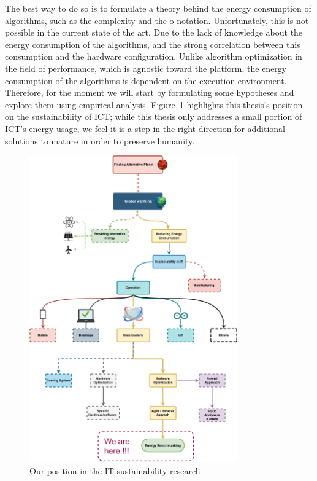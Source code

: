 The best way to do so is to formulate a theory behind the energy consumption of algorithms, such as the complexity and the o notation.
Unfortunately, this is not possible in the current state of the art. Due to the lack of knowledge about the energy consumption of the algorithms, and the strong correlation between this consumption and the hardware configuration.
Unlike algorithm optimization in the field of performance, which is agnostic toward the platform, the energy consumption of the algorithms is dependent on the execution environment.
Therefore, for the moment we will start by formulating some hypotheses and explore them using empirical analysis.
Figure~\ref{fig:thesis_position} highlights this thesis's position on the sustainability of ICT\@; while this thesis only addresses a small portion of ICT's energy usage, we feel it is a step in the right direction for additional solutions to mature in order to preserve humanity.
\begin{figure}[!h]
    \caption{Our position in the IT sustainability research}
    \label{fig:thesis_position}
    \includegraphics[width=0.8\textwidth,height=\textheight,keepaspectratio]{chapters/thesis_position.pdf}
\end{figure}
